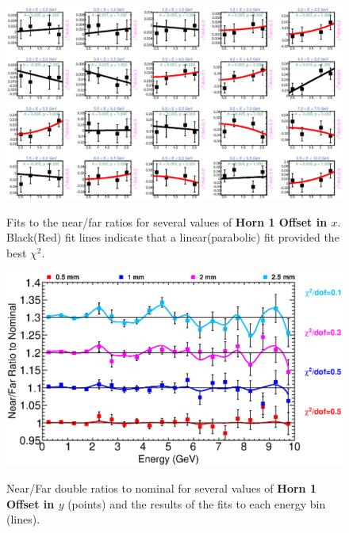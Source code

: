 \begin{figure}[ht]
  \begin{center}
    {\includegraphics[width=5.0in]{figures/Horn1XOffset_nof_fits.eps}}
  \end{center}
\caption{ Fits to the near/far ratios for several values of {\bf Horn 1 Offset in $x$}. Black(Red) fit lines indicate that a linear(parabolic) fit provided the best $\chi^2$. }
\end{figure}

\begin{figure}[ht]
  \begin{center}
    {\includegraphics[width=6.0in]{figures/Horn1YOffset_nof_summary.eps}}
  \end{center}
\caption{ Near/Far double ratios to nominal for several values of {\bf Horn 1 Offset in $y$} (points) and the results of the fits to each energy bin (lines).}
\end{figure}

